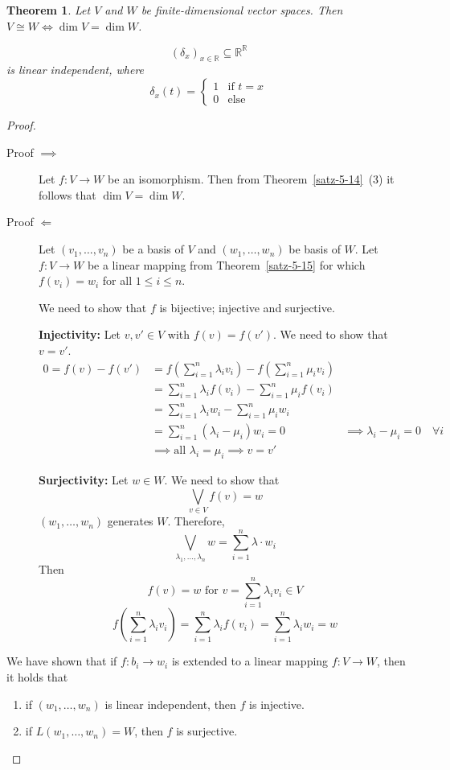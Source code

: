 \documentclass[a4paper,landscape,twocolumn]{article}
\newtheorem{theorem}{Theorem}[section]
\begin{document}
\begin{theorem}
  \label{satz-5-16}
  Let $V$ and $W$ be finite-dimensional vector spaces.
  Then $V \cong W \iff \dim{V} = \dim{W}$.

  \[ \left(\delta_{x}\right)_{x \in \mathbb R} \subseteq \mathbb R^{\mathbb R} \]
  is linear independent, where
  \[
    \delta_x(t) = \begin{cases}
      1 & \text{if } t = x \\
      0 & \text{else}
    \end{cases}
  \]
\end{theorem}
\begin{proof}
  \begin{description}
    \item[Proof $\implies$]
      Let $f: V \rightarrow W$ be an isomorphism. Then from Theorem~\ref{satz-5-14}~(3)
      it follows that $\dim{V} = \dim{W}$.
    \item[Proof $\Leftarrow$]
      Let $(v_1, \dots, v_n)$ be a basis of $V$ and $(w_1, \dots, w_n)$ be basis of $W$.
      Let $f: V \rightarrow W$ be a linear mapping from Theorem~\ref{satz-5-15}
      for which $f(v_i) = w_i$ for all $1 \leq i \leq n$.

      We need to show that $f$ is bijective; injective and surjective.

      \textbf{Injectivity:} Let $v,v' \in V$ with $f(v) = f(v')$. We need to show that $v = v'$.
      \begin{align*}
        0 = f(v) - f(v')
          &= f\left(\sum_{i=1}^n \lambda_i v_i\right) - f\left(\sum_{i=1}^n \mu_i v_i\right) \\
          &= \sum_{i=1}^n \lambda_i f(v_i) - \sum_{i=1}^n \mu_i f(v_i) \\
          &= \sum_{i=1}^n \lambda_i w_i - \sum_{i=1}^n \mu_i w_i \\
          &= \sum_{i=1}^n (\lambda_i - \mu_i) w_i = 0
          &\implies \lambda_i - \mu_i = 0 \quad\forall i \\
          &\implies \text{all } \lambda_i = \mu_i \implies v = v'
      \end{align*}

      \textbf{Surjectivity:} Let $w \in W$. We need to show that
      \[ \bigvee_{v \in V} f(v) = w \]
      $(w_1, \dots, w_n)$ generates $W$. Therefore,
      \[ \bigvee_{\lambda_1, \dots, \lambda_n} w = \sum_{i=1}^n \lambda \cdot w_i \]
      Then
      \[ f(v) = w \text{ for } v = \sum_{i=1}^n \lambda_i v_i \in V \]
      \[ f\left(\sum_{i=1}^n \lambda_i v_i\right) = \sum_{i=1}^n \lambda_i f(v_i) = \sum_{i=1}^n \lambda_i w_i = w \]
  \end{description}

  We have shown that if $f: b_i \rightarrow w_i$ is extended to a linear mapping $f: V \rightarrow W$,
  then it holds that
  \begin{enumerate}
    \item if $(w_1, \dots, w_n)$ is linear independent, then $f$ is injective.
    \item if $L(w_1, \dots, w_n) = W$, then $f$ is surjective.
  \end{enumerate}
\end{proof}
\end{document}
